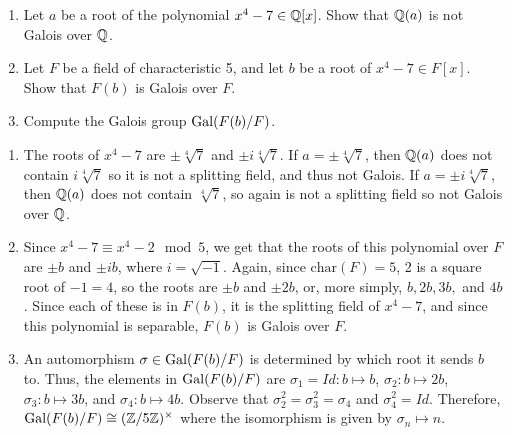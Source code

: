 %
\begin{question}[subtitle = January 2020 Problem 2,ID=Jan20_2]
\begin{enumerate}
    \item Let $a$ be a root of the polynomial $x^4-7 \in \mathbb{Q}[x]$. Show that $\mathbb{Q}(a)$ is not Galois over $\mathbb{Q}$.
    \item Let $F$ be a field of characteristic 5, and let $b$ be a root of $x^4-7 \in F[x]$. Show that $F(b)$ is Galois over $F$.
    \item Compute the Galois group $\operatorname{Gal}(F(b)/F)$.
\end{enumerate}
\end{question}
\begin{solution}
\begin{enumerate}
    \item The roots of $x^4-7$ are $\pm \sqrt[4]{7}$ and $\pm i\sqrt[4]{7}$. If $a =\pm \sqrt[4]{7}$, then $\mathbb{Q}(a)$ does not contain $i\sqrt[4]{7}$ so it is not a splitting field, and thus not Galois. If $a= \pm i\sqrt[4]{7}$, then $\mathbb{Q}(a)$ does not contain $\sqrt[4]{7}$, so again is not a splitting field so not Galois over $\mathbb{Q}$.
    \item Since $x^4-7 \equiv x^4-2 \mod 5$, we get that the roots of this polynomial over $F$ are $\pm b$ and $\pm ib$, where $i=\sqrt{-1}$. Again, since $\text{char}(F)=5$, 2 is a square root of $-1 = 4$, so the roots are $\pm b$ and $\pm 2b$, or, more simply, $b,2b, 3b,$ and $4b$. Since each of these is in $F(b)$, it is the splitting field of $x^4-7$, and since this polynomial is separable, $F(b)$ is Galois over $F$.
    \item An automorphism $\sigma \in \operatorname{Gal}(F(b)/F)$ is determined by which root it sends $b$ to. Thus, the elements in $\operatorname{Gal}(F(b)/F)$ are $\sigma_1=Id: b \mapsto b$, $\sigma_2: b \mapsto 2b$, $\sigma_3: b \mapsto 3b$, and $\sigma_4: b\mapsto 4b$. Observe that $\sigma_2^2=\sigma_3^2=\sigma_4$ and $\sigma_4^2=Id$. Therefore, $\operatorname{Gal}(F(b)/F)\cong (\mathbb{Z}/5\mathbb{Z})^{\times}$ where the isomorphism is given by $\sigma_n \mapsto n$.
\end{enumerate}
\end{solution}

